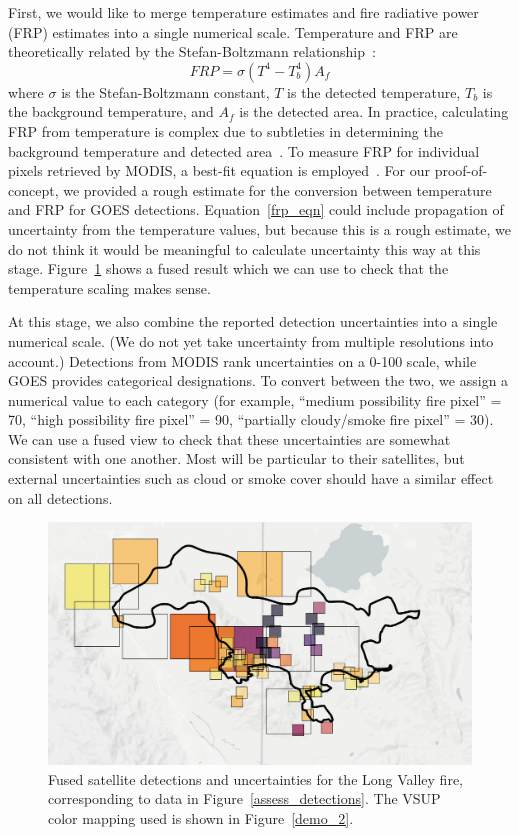 First, we would like to merge temperature estimates and fire radiative power (FRP) estimates into a single numerical scale. Temperature and FRP are theoretically related by the Stefan-Boltzmann relationship~\cite{Peterson2012a}:
\begin{equation}
FRP = \sigma(T^4 - T_b^4)A_f
\label{frp_eqn}
\end{equation}
where $\sigma$ is the Stefan-Boltzmann constant, $T$ is the detected temperature, $T_b$ is the background temperature, and $A_f$ is the detected area. In practice, calculating FRP from temperature is complex due to subtleties in determining the background temperature and detected area~\cite{Xu2010}. To measure FRP for individual pixels retrieved by MODIS, a best-fit equation is employed~\cite{Peterson2012a}. For our proof-of-concept, we provided a rough estimate for the conversion between temperature and FRP for GOES detections. Equation~\ref{frp_eqn} could include propagation of uncertainty from the temperature values, but because this is a rough estimate, we do not think it would be meaningful to calculate uncertainty this way at this stage. Figure~\ref{fuse_detections} shows a fused result which we can use to check that the temperature scaling makes sense.

At this stage, we also combine the reported detection uncertainties into a single numerical scale. (We do not yet take uncertainty from multiple resolutions into account.) Detections from MODIS rank uncertainties on a 0-100 scale, while GOES provides categorical designations. To convert between the two, we assign a numerical value to each category (for example, ``medium possibility fire pixel'' = 70, ``high possibility fire pixel'' = 90, ``partially cloudy/smoke fire pixel'' = 30). We can use a fused view to check that these uncertainties are somewhat consistent with one another. Most will be particular to their satellites, but external uncertainties such as cloud or smoke cover should have a similar effect on all detections.

\begin{figure}[h]
     \centering
    \includegraphics[width=\textwidth]{images/remote_sensing/step_2_example.png}
     \caption{Fused satellite detections and uncertainties for the Long Valley fire, corresponding to data in Figure~\ref{assess_detections}. The VSUP~\cite{VSUP} color mapping used is shown in Figure~\ref{demo_2}.}
     \label{fuse_detections}
\end{figure}

